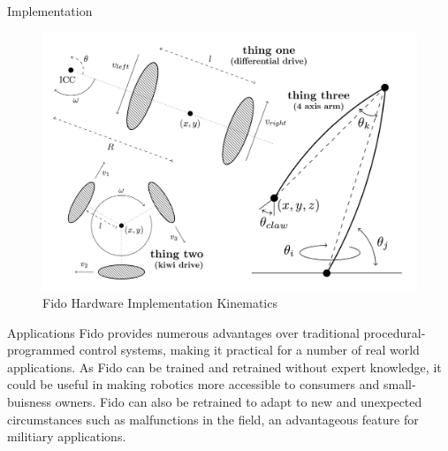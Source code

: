 \documentclass[final]{beamer}
\newlength{\onecolwid}
\begin{document}
\begin{frame}[t]
\begin{columns}[t]
\begin{column}{\onecolwid}
\begin{block}{Implementation}

		\begin{figure}[ht]
			\centering
			\includegraphics[width=.8\linewidth]{Figures/combinedKinematics.png}
			\caption{Fido Hardware Implementation Kinematics}
		\end{figure}

		\vspace{-0.5in}

	\end{block}

	\begin{block}{Applications}
		Fido provides numerous advantages over traditional procedural-programmed control systems, making it practical for a number of real world applications.  As Fido can be trained and retrained without expert knowledge, it could be useful in making robotics more accessible to consumers and small-buisness owners.  Fido can also be retrained to adapt to new and unexpected circumstances such as malfunctions in the field, an advantageous feature for militiary applications.
	\end{block}

\end{column}

\end{columns}
\end{frame}
\end{document}
